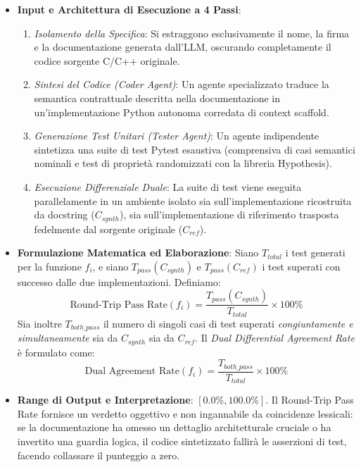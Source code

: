 \begin{itemize}[leftmargin=*, label=\textbullet]
    \item \textbf{Input e Architettura di Esecuzione a 4 Passi}:
    \begin{enumerate}
        \item \emph{Isolamento della Specifica}: Si estraggono esclusivamente il nome, la firma e la documentazione generata dall'LLM, oscurando completamente il codice sorgente C/C++ originale.
        \item \emph{Sintesi del Codice (Coder Agent)}: Un agente specializzato traduce la semantica contrattuale descritta nella documentazione in un'implementazione Python autonoma corredata di context scaffold.
        \item \emph{Generazione Test Unitari (Tester Agent)}: Un agente indipendente sintetizza una suite di test Pytest esaustiva (comprensiva di casi semantici nominali e test di proprietà randomizzati con la libreria Hypothesis).
        \item \emph{Esecuzione Differenziale Duale}: La suite di test viene eseguita parallelamente in un ambiente isolato sia sull'implementazione ricostruita da docstring ($C_{synth}$), sia sull'implementazione di riferimento trasposta fedelmente dal sorgente originale ($C_{ref}$).
    \end{enumerate}
    \item \textbf{Formulazione Matematica ed Elaborazione}: Siano $T_{total}$ i test generati per la funzione $f_i$, e siano $T_{pass}(C_{synth})$ e $T_{pass}(C_{ref})$ i test superati con successo dalle due implementazioni. Definiamo:
    \begin{equation}
        \text{Round-Trip Pass Rate}(f_i) = \frac{T_{pass}(C_{synth})}{T_{total}} \times 100\%
        \label{eq:rt_pass_rate}
    \end{equation}
    Sia inoltre $T_{both\_pass}$ il numero di singoli casi di test superati \emph{congiuntamente e simultaneamente} sia da $C_{synth}$ sia da $C_{ref}$. Il \emph{Dual Differential Agreement Rate} è formulato come:
    \begin{equation}
        \text{Dual Agreement Rate}(f_i) = \frac{T_{both\_pass}}{T_{total}} \times 100\%
        \label{eq:dual_agreement}
    \end{equation}
    \item \textbf{Range di Output e Interpretazione}: $[0.0\%, 100.0\%]$. Il Round-Trip Pass Rate fornisce un verdetto oggettivo e non ingannabile da coincidenze lessicali: se la documentazione ha omesso un dettaglio architetturale cruciale o ha invertito una guardia logica, il codice sintetizzato fallirà le asserzioni di test, facendo collassare il punteggio a zero.
\end{itemize}
